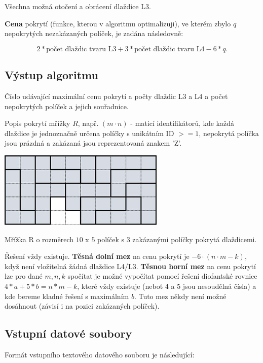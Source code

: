 \documentclass[]{article}
\begin{document}
 \noindent 
Všechna možná otočení a obrácení dlaždice L3.

\noindent
\textbf{Cena} pokrytí (funkce, kterou v algoritmu optimalizuji), ve kterém zbylo $q$ nepokrytých nezakázaných políček, je zadána následovně: 

$$ 2 * \text{počet dlaždic tvaru L3} + 3 * \text{počet dlaždic tvaru L4} - 6*q. $$

\subsection{Výstup algoritmu}

Číslo udávající maximální cenu pokrytí a počty dlaždic L3 a L4 a počet nepokrytých políček a jejich souřadnice.

\noindent
Popis pokrytí mřížky $R$, např. $(m \cdot n)$ - maticí identifikátorů, kde každá dlaždice je jednoznačně určena políčky 
s unikátním ID $>=1$, nepokrytá políčka jsou prázdná a zakázaná jsou reprezentovaná znakem 'Z'. 

\begin{center}
    \includegraphics{l-example.jpg}
     \label{obr3}
    \end{center}
    
    \noindent
Mřížka R o rozměrech $10$ x $5$ políček s $3$ zakázanými políčky pokrytá dlaždicemi.

\noindent
Řešení vždy existuje.
\textbf{Těsná dolní mez} na cenu pokrytí je $- 6 \cdot( n \cdot m-k)$, když není vložitelná žádná dlaždice L4/L3.
\textbf{Těsnou horní mez} na cenu pokrytí lze pro dané $m,n,k$ spočítat je možné vypočítat pomocí řešení diofantské rovnice
$4*a+5*b=n*m-k$, které vždy existuje (neboť 4 a 5 jsou nesoudělná čísla) a kde bereme kladné řešení s maximálním $b$. Tuto mez někdy není možné dosáhnout (závisí i na pozici zakázaných políček).


\subsection{Vstupní datové soubory}


Formát vstupního textového datového souboru je následující:
\end{document}

